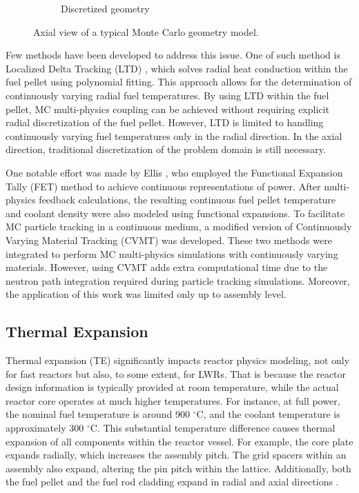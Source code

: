 \begin{figure}[h]
\begin{subfigure}[b]{0.25\textwidth}
        \caption{Discretized geometry}
        \label{fig_1b}
    \end{subfigure}
    \caption{Axial view of a typical Monte Carlo geometry model.}
       \label{fig_1}
\end{figure}

Few methods have been developed to address this issue. One of such method is Localized Delta Tracking (LTD) \cite{nchoi_2020}, which solves radial heat conduction within the fuel pellet using polynomial fitting. This approach allows for the determination of continuously varying radial fuel temperatures. By using LTD within the fuel pellet, MC multi-physics coupling can be achieved without requiring explicit radial discretization of the fuel pellet. However, LTD is limited to handling continuously varying fuel temperatures only in the radial direction. In the axial direction, traditional discretization of the problem domain is still necessary.

One notable effort was made by Ellis \cite{ellis}, who employed the Functional Expansion Tally (FET) method \cite{chadsey,gries} to achieve continuous representations of power. After multi-physics feedback calculations, the resulting continuous fuel pellet temperature and coolant density were also modeled using functional expansions. To facilitate MC particle tracking in a continuous medium, a modified version of Continuously Varying Material Tracking (CVMT) \cite{brown} was developed. These two methods were integrated to perform MC multi-physics simulations with continuously varying materials. However, using CVMT adds extra computational time due to the neutron path integration required during particle tracking simulations. Moreover, the application of this work was limited only up to assembly level.

\subsection{Thermal Expansion}

Thermal expansion (TE) significantly impacts reactor physics modeling, not only for fast reactors but also, to some extent, for LWRs. That is because the reactor design information is typically provided at room temperature, while the actual reactor core operates at much higher temperatures. For instance, at full power, the nominal fuel temperature is around 900 $^{\circ}$C, and the coolant temperature is approximately 300 $^{\circ}$C. This substantial temperature difference causes thermal expansion of all components within the reactor vessel. For example, the core plate expands radially, which increases the assembly pitch. The grid spacers within an assembly also expand, altering the pin pitch within the lattice. Additionally, both the fuel pellet and the fuel rod cladding expand in radial and axial directions \cite{palmtag}.

